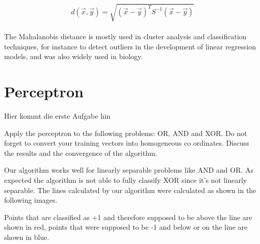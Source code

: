 \documentclass{article}
\begin{document}
\begin{equation}
d(\vec{x},\vec{y}) = \sqrt{(\vec{x}-\vec{y})^TS^{-1}(\vec{x}-\vec{y})}
\end{equation}
\\
The Mahalanobis distance is mostly used in cluster analysis and classification techniques, for instance to detect outliers in the development of linear regression models, and was also widely used in biology.
\pagebreak

\section{Perceptron}

Hier kommt die erste Aufgabe hin

Apply the perceptron to the following problems: OR, AND and XOR. Do not
forget to convert your training vectors into homogeneous co ordinates. Discuss
the results and the convergence of the algorithm. 

Our algorithm works well for linearly separable problems like AND and OR. As expected the algorithm is not able to fully classify XOR since it's not linearly separable.
The lines calculated by our algorithm were calculated as shown in the following images.

Points that are classified as +1 and therefore supposed to be above the line are shown in red, points that were supposed to be -1 and below or on the line are shown in blue.
\end{document}

